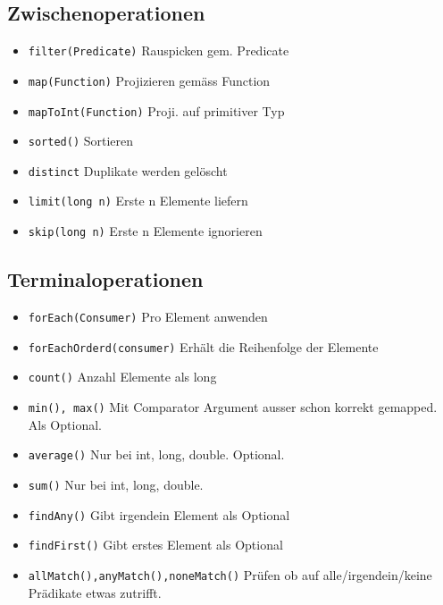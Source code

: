 \begin{multicols*}{5}
	\subsection{Zwischenoperationen}
		\begin{itemize}
			\item \tiny \textcolor{b}{\texttt{filter(Predicate)}}
				\footnotesize Rauspicken gem. Predicate
			\item \tiny \textcolor{b}{\texttt{map(Function)}}
				\footnotesize Projizieren gemäss Function
			\item \tiny \textcolor{b}{\texttt{mapToInt(Function)}}
				\footnotesize Proji. auf primitiver Typ
			\item \tiny \textcolor{b}{\texttt{sorted()}}
				\footnotesize Sortieren
			\item \tiny \textcolor{b}{\texttt{distinct}}
				\footnotesize Duplikate werden gelöscht
			\item \tiny \textcolor{b}{\texttt{limit(long n)}}
				\footnotesize Erste n Elemente liefern
			\item \tiny \textcolor{b}{\texttt{skip(long n)}}
				\footnotesize Erste n Elemente ignorieren
		\end{itemize}
	\subsection{Terminaloperationen}
		\begin{itemize}
			\item \tiny \textcolor{b}{\texttt{forEach(Consumer)}}
				\footnotesize Pro Element anwenden
			\item \tiny \textcolor{b}{\texttt{forEachOrderd(consumer)}}
				\footnotesize Erhält die Reihenfolge der Elemente
			\item \tiny \textcolor{b}{\texttt{count()}}
				\footnotesize Anzahl Elemente als long
			\item \tiny \textcolor{b}{\texttt{min(), max()}}
				\footnotesize Mit Comparator Argument ausser schon korrekt gemapped. Als Optional.
			\item \tiny \textcolor{b}{\texttt{average()}}
				\footnotesize Nur bei int, long, double. Optional.
			\item \tiny \textcolor{b}{\texttt{sum()}}
				\footnotesize Nur bei int, long, double.
			\item \tiny \textcolor{b}{\texttt{findAny()}}
				\footnotesize Gibt irgendein Element als Optional
			\item \tiny \textcolor{b}{\texttt{findFirst()}}
				\footnotesize Gibt erstes Element als Optional
			\item \tiny \textcolor{b}{\texttt{allMatch(),anyMatch(),noneMatch()}}
			\footnotesize Prüfen ob auf alle/irgendein/keine Prädikate etwas zutrifft.
		\end{itemize}

\end{multicols*}
